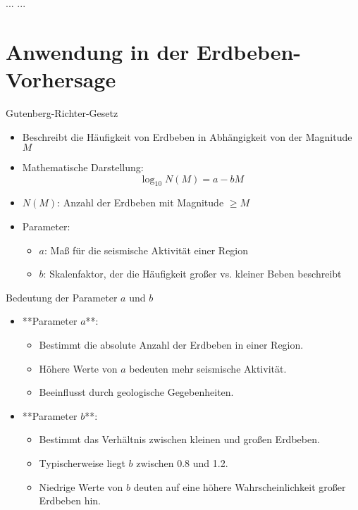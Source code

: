 \documentclass{beamer}
\begin{document}
\begin{frame}{...}
	...
\end{frame}

\section{Anwendung in der Erdbeben-Vorhersage}
\begin{frame}{Gutenberg-Richter-Gesetz}
	\begin{itemize}
		\item Beschreibt die Häufigkeit von Erdbeben in Abhängigkeit von der Magnitude $M$
		\item Mathematische Darstellung:
		\[ \log_{10} N(M) = a - bM \]
		\item $N(M)$: Anzahl der Erdbeben mit Magnitude $\geq M$
		\item Parameter:
		\begin{itemize}
			\item $a$: Maß für die seismische Aktivität einer Region
			\item $b$: Skalenfaktor, der die Häufigkeit großer vs. kleiner Beben beschreibt
		\end{itemize}
	\end{itemize}
\end{frame}

\begin{frame}{Bedeutung der Parameter $a$ und $b$}
	\begin{itemize}
		\item **Parameter $a$**:
		\begin{itemize}
			\item Bestimmt die absolute Anzahl der Erdbeben in einer Region.
			\item Höhere Werte von $a$ bedeuten mehr seismische Aktivität.
			\item Beeinflusst durch geologische Gegebenheiten.
		\end{itemize}
		\item **Parameter $b$**:
		\begin{itemize}
			\item Bestimmt das Verhältnis zwischen kleinen und großen Erdbeben.
			\item Typischerweise liegt $b$ zwischen 0.8 und 1.2.
			\item Niedrige Werte von $b$ deuten auf eine höhere Wahrscheinlichkeit großer Erdbeben hin.
		\end{itemize}
	\end{itemize}
\end{frame}
\end{document}
